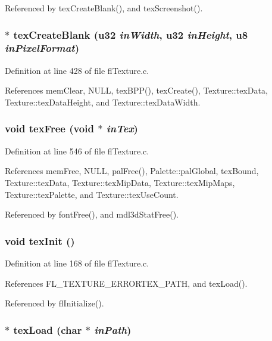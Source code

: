 Referenced by tex\-Create\-Blank(), and tex\-Screenshot().
\subsubsection{$\ast$ tex\-Create\-Blank (u32 {\em in\-Width}, u32 {\em in\-Height}, u8 {\em in\-Pixel\-Format})}\label{flTexture_8h_6e73ae11c73736849b72913fa3835bf0}




Definition at line 428 of file fl\-Texture.c.

References mem\-Clear, NULL, tex\-BPP(), tex\-Create(), Texture::tex\-Data, Texture::tex\-Data\-Height, and Texture::tex\-Data\-Width.
\subsubsection{\setlength{\rightskip}{0pt plus 5cm}void tex\-Free (void $\ast$ {\em in\-Tex})}\label{flTexture_8h_8fb8e4b38a9296ed9af008419170efee}




Definition at line 546 of file fl\-Texture.c.

References mem\-Free, NULL, pal\-Free(), Palette::pal\-Global, tex\-Bound, Texture::tex\-Data, Texture::tex\-Mip\-Data, Texture::tex\-Mip\-Maps, Texture::tex\-Palette, and Texture::tex\-Use\-Count.

Referenced by font\-Free(), and mdl3d\-Stat\-Free().
\subsubsection{\setlength{\rightskip}{0pt plus 5cm}void tex\-Init ()}\label{flTexture_8h_d71c7b4ba0396ef491df47e51dd55235}




Definition at line 168 of file fl\-Texture.c.

References FL\_\-TEXTURE\_\-ERRORTEX\_\-PATH, and tex\-Load().

Referenced by fl\-Initialize().
\subsubsection{$\ast$ tex\-Load (char $\ast$ {\em in\-Path})}\label{flTexture_8h_723acca77c2b47c9f8f9d1064ee509ee}




